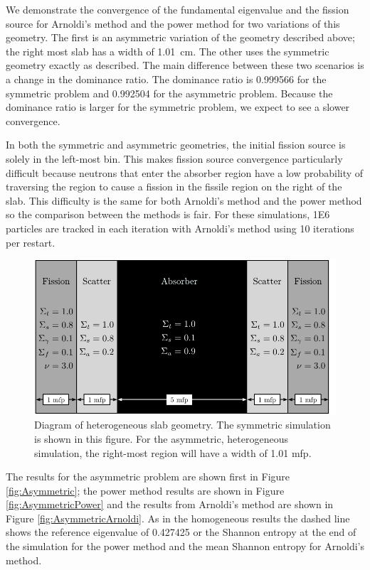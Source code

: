 \documentclass[12]{ansnse}
\begin{document}
\begin{doublespace}
We demonstrate the convergence of the fundamental eigenvalue and the fission source for Arnoldi's method and the power method for two variations of this geometry.  The first is an asymmetric variation of the geometry described above; the right most slab has a width of \SI{1.01}{\centi\meter}.  The other uses the symmetric geometry exactly as described.  The main difference between these two scenarios is a change in the dominance ratio.  The dominance ratio is \num[group-digits=false]{0.999566} for the symmetric problem and \num[group-digits=false]{0.992504} for the asymmetric problem.  Because the dominance ratio is larger for the symmetric problem, we expect to see a slower convergence.

In both the symmetric and asymmetric geometries, the initial fission source is solely in the left-most bin.  This makes fission source convergence particularly difficult because neutrons that enter the absorber region have a low probability of traversing the region to cause a fission in the fissile region on the right of the slab.  This difficulty is the same for both Arnoldi's method and the power method so the comparison between the methods is fair.  For these simulations, \num{1E6} particles are tracked in each iteration with Arnoldi's method using 10 iterations per restart.

\begin{figure}[h]\centering
    \includegraphics[width=\textwidth,keepaspectratio]{Figures/MultimediaCartoon}
    \caption{Diagram of heterogeneous slab geometry.  The symmetric simulation is shown in this figure.  For the asymmetric, heterogeneous simulation, the right-most region will have a width of 1.01 mfp.}
    \label{fig:HeteroGeometry}
\end{figure}

The results for the asymmetric problem are shown first in Figure \ref{fig:Asymmetric}; the power method results are shown in Figure \ref{fig:AsymmetricPower} and the results from Arnoldi's method are shown in Figure \ref{fig:AsymmetricArnoldi}.  As in the homogeneous results the dashed line shows the reference eigenvalue\cite{Kornreich:2002Semi--0} of \num[group-digits=false]{0.427425} or the Shannon entropy at the end of the simulation for the power method and the mean Shannon entropy for Arnoldi's method.


\end{doublespace}
\end{document}
